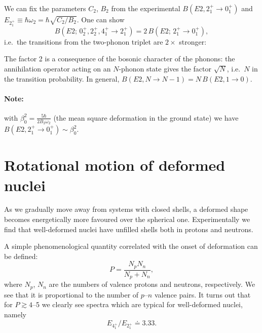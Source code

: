 \documentclass[11pt,a4paper]{article}
\begin{document}
We can fix the parameters $C_2$, $B_2$ from the experimental $B(E2,2^+_1\to0^+_1)$ and $E_{2^+_1}\equiv\hbar\omega_2=\hbar\sqrt{C_2/B_2}$.
One can show
\[
\boxed{B(E2;\,0^+_2,2^+_2,4^+_1\to2^+_1)=2\,B(E2;\,2^+_1\to0^+_1)},
\]
i.e.\ the transitions from the two-phonon triplet are $2\times$ stronger:
\begin{center}
\end{center}

The factor 2 is a consequence of the bosonic character of the phonons: the annihilation operator acting on an $N$-phonon state gives the factor $\sqrt N$, i.e.\ $N$ in the transition probability. In general, $B(E2,N\to N-1)=N\,B(E2,1\to0)$.

\paragraph{Note:} with $\beta_0^2=\frac{5\hbar}{2B_2\omega_2}$ (the mean square deformation in the ground state) we have $B(E2,2^+_1\to0^+_1)\sim\beta_0^2$.

\section{Rotational motion of deformed nuclei}

\label{sec:rot}

As we gradually move away from systems with closed shells, a deformed shape becomes energetically more favoured over the spherical one. Experimentally we find that well-deformed nuclei have unfilled shells both in protons and neutrons.

A simple phenomenological quantity correlated with the onset of deformation can be defined:
\[
P=\frac{N_pN_n}{N_p+N_n},
\]
where $N_p$, $N_n$ are the numbers of valence protons and neutrons, respectively. We see that it is proportional to the number of $p$--$n$ valence pairs. It turns out that for $P\gtrsim4$--5 we clearly see spectra which are typical for well-deformed nuclei, namely
\[
E_{4^+_1}/E_{2^+_1}\doteq3.33 .
\]
\end{document}
